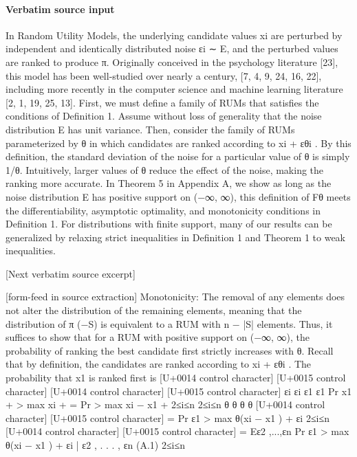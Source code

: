 \documentclass[10pt]{article}
\begin{document}
\paragraph{Verbatim source input}
\begin{ReviewVerbatim}
In Random Utility Models, the underlying candidate values xi are perturbed by independent and identically
distributed noise εi ∼ E, and the perturbed values are ranked to produce π. Originally conceived in the
psychology literature [23], this model has been well-studied over nearly a century, [7, 4, 9, 24, 16, 22],
including more recently in the computer science and machine learning literature [2, 1, 19, 25, 13].
First, we must define a family of RUMs that satisfies the conditions of Definition 1. Assume without loss of
generality that the noise distribution E has unit variance. Then, consider the family of RUMs parameterized
by θ in which candidates are ranked according to xi + εθi . By this definition, the standard deviation of the
noise for a particular value of θ is simply 1/θ. Intuitively, larger values of θ reduce the effect of the noise,
making the ranking more accurate. In Theorem 5 in Appendix A, we show as long as the noise distribution
E has positive support on (−∞, ∞), this definition of Fθ meets the differentiability, asymptotic optimality,
and monotonicity conditions in Definition 1. For distributions with finite support, many of our results can
be generalized by relaxing strict inequalities in Definition 1 and Theorem 1 to weak inequalities.

[Next verbatim source excerpt]


[form-feed in source extraction]
Monotonicity: The removal of any elements does not alter the distribution of the remaining elements,
meaning that the distribution of π (−S) is equivalent to a RUM with n − |S| elements. Thus, it suffices to
show that for a RUM with positive support on (−∞, ∞), the probability of ranking the best candidate first
strictly increases with θ.
Recall that by definition, the candidates are ranked according to xi + εθi . The probability that x1 is
ranked first is
[U+0014 control character]
[U+0015 control character]
[U+0014 control character]
[U+0015 control character]
εi
εi
ε1
ε1
Pr x1 +
> max xi +
= Pr
> max xi − x1 +
2≤i≤n
2≤i≤n
θ
θ
θ
θ
[U+0014 control character]
[U+0015 control character]
= Pr ε1 > max θ(xi − x1 ) + εi
2≤i≤n
[U+0014 control character]
[U+0015 control character]
= Eε2 ,...,εn Pr ε1 > max θ(xi − x1 ) + εi | ε2 , . . . , εn
(A.1)
2≤i≤n


\end{ReviewVerbatim}
\end{document}
